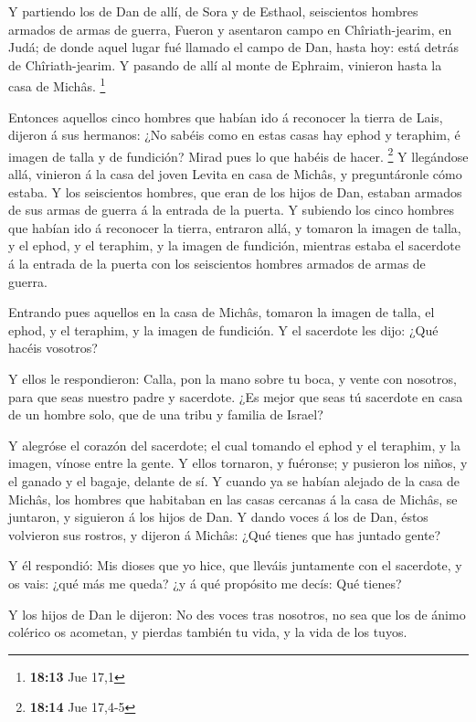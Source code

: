  Y partiendo los de Dan de allí, de Sora y de Esthaol,
seiscientos hombres armados de armas de guerra,  Fueron y
asentaron campo en Chîriath-jearim, en Judá; de donde aquel lugar fué
llamado el campo de Dan, hasta hoy: está detrás de Chîriath-jearim.
 Y pasando de allí al monte de Ephraim, vinieron hasta la
casa de Michâs. \footnote{\textbf{18:13} Jue 17,1}

 Entonces aquellos cinco hombres que habían ido á reconocer
la tierra de Lais, dijeron á sus hermanos: ¿No sabéis como en estas
casas hay ephod y teraphim, é imagen de talla y de fundición? Mirad pues
lo que habéis de hacer. \footnote{\textbf{18:14} Jue 17,4-5}
 Y llegándose allá, vinieron á la casa del joven Levita en
casa de Michâs, y preguntáronle cómo estaba.  Y los
seiscientos hombres, que eran de los hijos de Dan, estaban armados de
sus armas de guerra á la entrada de la puerta.  Y subiendo
los cinco hombres que habían ido á reconocer la tierra, entraron allá, y
tomaron la imagen de talla, y el ephod, y el teraphim, y la imagen de
fundición, mientras estaba el sacerdote á la entrada de la puerta con
los seiscientos hombres armados de armas de guerra.

 Entrando pues aquellos en la casa de Michâs, tomaron la
imagen de talla, el ephod, y el teraphim, y la imagen de fundición. Y el
sacerdote les dijo: ¿Qué hacéis vosotros?

 Y ellos le respondieron: Calla, pon la mano sobre tu boca,
y vente con nosotros, para que seas nuestro padre y sacerdote. ¿Es mejor
que seas tú sacerdote en casa de un hombre solo, que de una tribu y
familia de Israel?

 Y alegróse el corazón del sacerdote; el cual tomando el
ephod y el teraphim, y la imagen, vínose entre la gente.  Y
ellos tornaron, y fuéronse; y pusieron los niños, y el ganado y el
bagaje, delante de sí.  Y cuando ya se habían alejado de la
casa de Michâs, los hombres que habitaban en las casas cercanas á la
casa de Michâs, se juntaron, y siguieron á los hijos de Dan.
 Y dando voces á los de Dan, éstos volvieron sus rostros, y
dijeron á Michâs: ¿Qué tienes que has juntado gente?

 Y él respondió: Mis dioses que yo hice, que lleváis
juntamente con el sacerdote, y os vais: ¿qué más me queda? ¿y á qué
propósito me decís: Qué tienes?

 Y los hijos de Dan le dijeron: No des voces tras nosotros,
no sea que los de ánimo colérico os acometan, y pierdas también tu vida,
y la vida de los tuyos.

